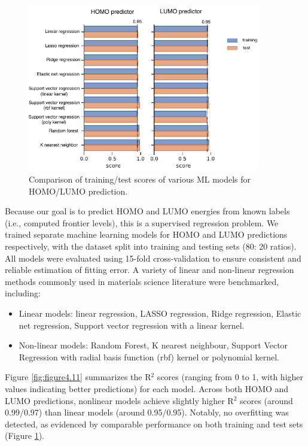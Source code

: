 \begin{figure}[htbp]
    \centering
    \includegraphics[width=0.9\textwidth]{figures/HT-ML/figure4-12.pdf}
    \caption{Comparison of training/test scores of various ML models for HOMO/LUMO prediction.}
    \label{fig:figure4.12}
\end{figure}

Because our goal is to predict HOMO and LUMO energies from known labels (i.e., computed frontier levels), this is a supervised regression problem. We trained separate machine learning models for HOMO and LUMO predictions respectively, with the dataset split into training and testing sets (80: 20 ratios). All models were evaluated using 15-fold cross-validation to ensure consistent and reliable estimation of fitting error. A variety of linear and non-linear regression methods commonly used in materials science literature were benchmarked, including:
\begin{itemize}
    \item Linear models: linear regression, LASSO regression, Ridge regression, Elastic net regression, Support vector regression with a linear kernel.

    \item Non-linear models: Random Forest, K nearest neighbour, Support Vector Regression with radial basis function (rbf) kernel or polynomial kernel. 
\end{itemize}

Figure \ref{fig:figure4.11} summarizes the R$^2$ scores (ranging from 0 to 1, with higher values indicating better predictions) for each model. Across both HOMO and LUMO predictions, nonlinear models achieve slightly higher R$^2$ scores (around 0.99/0.97) than linear models (around 0.95/0.95). Notably, no overfitting was detected, as evidenced by comparable performance on both training and test sets (Figure \ref{fig:figure4.12}).

